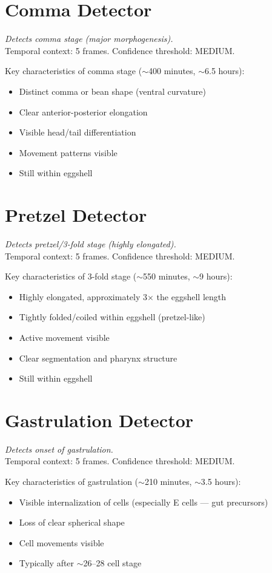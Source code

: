 \documentclass[11pt,letterpaper]{article}
\begin{document}
\section{Comma Detector}

\textit{Detects comma stage (major morphogenesis).}\\
Temporal context: 5 frames. Confidence threshold: MEDIUM.

Key characteristics of comma stage ($\sim$400 minutes, $\sim$6.5 hours):
\begin{itemize}
    \item Distinct comma or bean shape (ventral curvature)
    \item Clear anterior-posterior elongation
    \item Visible head/tail differentiation
    \item Movement patterns visible
    \item Still within eggshell
\end{itemize}

\section{Pretzel Detector}

\textit{Detects pretzel/3-fold stage (highly elongated).}\\
Temporal context: 5 frames. Confidence threshold: MEDIUM.

Key characteristics of 3-fold stage ($\sim$550 minutes, $\sim$9 hours):
\begin{itemize}
    \item Highly elongated, approximately 3$\times$ the eggshell length
    \item Tightly folded/coiled within eggshell (pretzel-like)
    \item Active movement visible
    \item Clear segmentation and pharynx structure
    \item Still within eggshell
\end{itemize}

\section{Gastrulation Detector}

\textit{Detects onset of gastrulation.}\\
Temporal context: 5 frames. Confidence threshold: MEDIUM.

Key characteristics of gastrulation ($\sim$210 minutes, $\sim$3.5 hours):
\begin{itemize}
    \item Visible internalization of cells (especially E cells --- gut precursors)
    \item Loss of clear spherical shape
    \item Cell movements visible
    \item Typically after $\sim$26--28 cell stage
\end{itemize}
\end{document}
